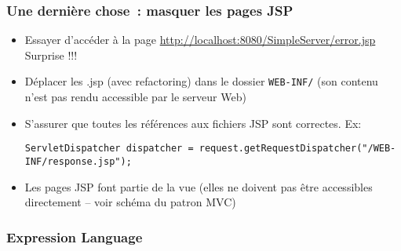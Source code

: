 \documentclass{beamer}
\begin{document}
\begin{frame}[fragile]
	\frametitle{Une dernière chose~: masquer les pages JSP}
	\begin{itemize}
		\item Essayer d'accéder à la page \url{http://localhost:8080/SimpleServer/error.jsp}\\
		Surprise !!!
		\item Déplacer les .jsp (avec refactoring) dans le dossier \texttt{WEB-INF/} (son contenu n'est pas rendu accessible par le serveur Web)
		\item S'assurer que toutes les références aux fichiers JSP sont correctes. Ex:\\
		\begin{lstlisting}
ServletDispatcher dispatcher = request.getRequestDispatcher("/WEB-INF/response.jsp");
		\end{lstlisting}
		\item Les pages JSP font partie de la vue (elles ne doivent pas être accessibles directement -- voir schéma du patron MVC)
	\end{itemize}
\end{frame}

\begin{frame}[fragile]
	\frametitle{Expression Language}
\end{frame}
\end{document}
